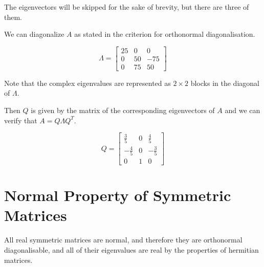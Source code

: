 The eigenvectors will be skipped for the sake of brevity, but there are three of them.

We can diagonalize \(A\) as stated in the criterion for orthonormal diagonalisation. 

\[
    \Lambda = 
    \begin{bmatrix}
        25 & 0 & 0 \\
        0 & 50 & -75 \\
        0 & 75 & 50
    \end{bmatrix}
\]

Note that the complex eigenvalues are represented as \(2 \times 2\) blocks in the diagonal of \(\Lambda\).

Then \(Q\) is given by the matrix of the corresponding eigenvectors of \(A\) and we can verify that \(A = Q \Lambda Q^T\).

\[
    Q = 
    \begin{bmatrix}
        \frac{3}{5} & 0 & \frac{4}{5} \\ 
        -\frac{4}{5} & 0 & -\frac{3}{5} \\
        0 & 1 & 0
    \end{bmatrix}
\]

\section{Normal Property of Symmetric Matrices}

All real symmetric matrices are normal, and therefore they are orthonormal diagonalisable,
and all of their eigenvalues are real by the properties of hermitian matrices.

